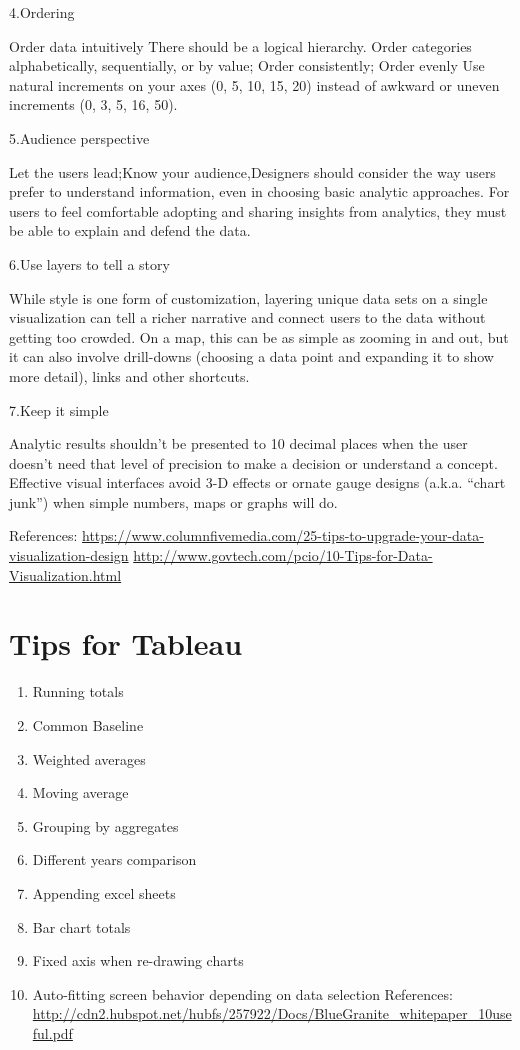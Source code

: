 \documentclass[]{book}
\providecommand{\tightlist}{%
  \setlength{\itemsep}{0pt}\setlength{\parskip}{0pt}}
\theoremstyle{definition}
\theoremstyle{definition}
\theoremstyle{definition}
\theoremstyle{remark}
\begin{document}
4.Ordering

Order data intuitively There should be a logical hierarchy. Order
categories alphabetically, sequentially, or by value; Order
consistently; Order evenly Use natural increments on your axes (0, 5,
10, 15, 20) instead of awkward or uneven increments (0, 3, 5, 16, 50).

5.Audience perspective

Let the users lead;Know your audience,Designers should consider the way
users prefer to understand information, even in choosing basic analytic
approaches. For users to feel comfortable adopting and sharing insights
from analytics, they must be able to explain and defend the data.

6.Use layers to tell a story

While style is one form of customization, layering unique data sets on a
single visualization can tell a richer narrative and connect users to
the data without getting too crowded. On a map, this can be as simple as
zooming in and out, but it can also involve drill-downs (choosing a data
point and expanding it to show more detail), links and other shortcuts.

7.Keep it simple

Analytic results shouldn't be presented to 10 decimal places when the
user doesn't need that level of precision to make a decision or
understand a concept. Effective visual interfaces avoid 3-D effects or
ornate gauge designs (a.k.a. ``chart junk'') when simple numbers, maps
or graphs will do.

References:
\url{https://www.columnfivemedia.com/25-tips-to-upgrade-your-data-visualization-design}
\url{http://www.govtech.com/pcio/10-Tips-for-Data-Visualization.html}

\chapter{Tips for Tableau}\label{tips-for-tableau-1}

\begin{enumerate}
\def\labelenumi{\arabic{enumi}.}
\tightlist
\item
  Running totals
\item
  Common Baseline
\item
  Weighted averages
\item
  Moving average
\item
  Grouping by aggregates
\item
  Different years comparison
\item
  Appending excel sheets
\item
  Bar chart totals
\item
  Fixed axis when re-drawing charts
\item
  Auto-fitting screen behavior depending on data selection References:
  \url{http://cdn2.hubspot.net/hubfs/257922/Docs/BlueGranite_whitepaper_10useful.pdf}
\end{enumerate}
\end{document}
